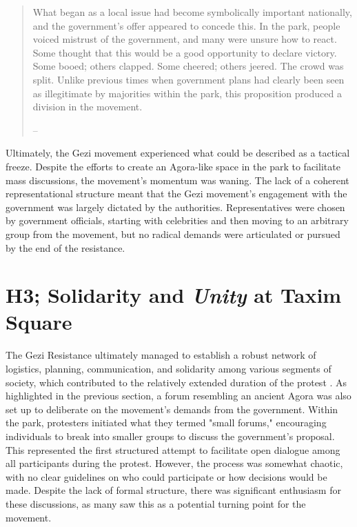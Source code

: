 \begin{quote} What began as a local issue had become symbolically important nationally, and the government’s offer appeared to concede this. In the park, people voiced mistrust of the government, and many were unsure how to react. Some thought that this would be a good opportunity to declare victory. Some booed; others clapped. Some cheered; others jeered. The crowd was split. Unlike previous times when government plans had clearly been seen as illegitimate by majorities within the park, this proposition produced a division in the movement.

-- \cite[73]{tufekci2020} \end{quote}

Ultimately, the Gezi movement experienced what could be described as a tactical freeze. Despite the efforts to create an Agora-like space in the park to facilitate mass discussions, the movement’s momentum was waning. The lack of a coherent representational structure meant that the Gezi movement’s engagement with the government was largely dictated by the authorities. Representatives were chosen by government officials, starting with celebrities and then moving to an arbitrary group from the movement, but no radical demands were articulated or pursued by the end of the resistance.

\section{H3; Solidarity and \textit{Unity} at Taxim Square}

The Gezi Resistance ultimately managed to establish a robust network of logistics, planning, communication, and solidarity among various segments of society, which contributed to the relatively extended duration of the protest \parencite[51]{tufekci2020}. As highlighted in the previous section, a forum resembling an ancient Agora was also set up to deliberate on the movement’s demands from the government. Within the park, protesters initiated what they termed "small forums," encouraging individuals to break into smaller groups to discuss the government's proposal. This represented the first structured attempt to facilitate open dialogue among all participants during the protest. However, the process was somewhat chaotic, with no clear guidelines on who could participate or how decisions would be made. Despite the lack of formal structure, there was significant enthusiasm for these discussions, as many saw this as a potential turning point for the movement.

